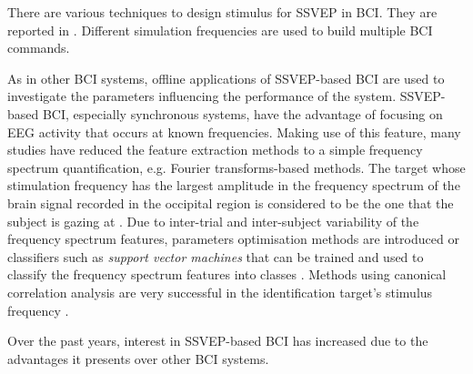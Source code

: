 There are various techniques to design stimulus for SSVEP in BCI. They are reported in \citep{zhu_survey_2010}. 
Different simulation frequencies are used to build multiple BCI commands.
\par
As in other BCI systems, offline applications of SSVEP-based BCI are used to investigate the parameters influencing the performance of the system. 
SSVEP-based BCI, especially synchronous systems, have the advantage of focusing on EEG activity that occurs at known frequencies. 
Making use of this feature, many studies have reduced the feature extraction methods to a simple frequency spectrum quantification, e.g. Fourier transforms-based methods. 
The target whose stimulation frequency has the largest amplitude in the frequency spectrum of the brain signal recorded in the occipital region is considered to be the one that the
subject is gazing at \citep{muller-putz_control_2008, pfurtscheller_self-paced_2010}. 
Due to inter-trial and inter-subject variability of the frequency spectrum features, parameters optimisation methods are introduced or classifiers such as \emph{support vector machines} that can be trained and used to classify the frequency spectrum features into classes \citep{kalunga_ssvep_2013}.
Methods using canonical correlation analysis are very successful in the identification target's stimulus frequency \citep{lin_frequency_2006, kalunga_ssvep_2013, nakanishi_high-speed_2014}.
\par
Over the past years, interest in SSVEP-based BCI has increased due to the advantages it presents over other BCI systems. 
